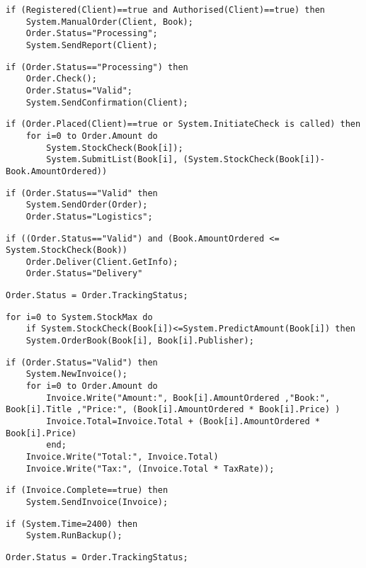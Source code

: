 \begin{lstlisting}[caption=/PF10/ Client places Order]
if (Registered(Client)==true and Authorised(Client)==true) then  
	System.ManualOrder(Client, Book);
	Order.Status="Processing";
	System.SendReport(Client);
\end{lstlisting}
\begin{lstlisting}[caption=/PF11/ Validate Order]
if (Order.Status=="Processing") then 
	Order.Check();
	Order.Status="Valid";
	System.SendConfirmation(Client);
\end{lstlisting}
\begin{lstlisting}[caption=/PF12/ Stock Update]
if (Order.Placed(Client)==true or System.InitiateCheck is called) then
	for i=0 to Order.Amount do
		System.StockCheck(Book[i]);
		System.SubmitList(Book[i], (System.StockCheck(Book[i])-Book.AmountOrdered))
\end{lstlisting}
\begin{lstlisting}[caption=/PF13/ Forward Order to Logistics]
if (Order.Status=="Valid" then
	System.SendOrder(Order);
	Order.Status="Logistics";
\end{lstlisting}
\begin{lstlisting}[caption=/PF14/ Deliver Order]
if ((Order.Status=="Valid") and (Book.AmountOrdered <= System.StockCheck(Book))
	Order.Deliver(Client.GetInfo);
	Order.Status="Delivery"
\end{lstlisting}
\begin{lstlisting}[caption=/PF15/ Confirm Delivery]
 Order.Status = Order.TrackingStatus;
\end{lstlisting}
\begin{lstlisting}[caption=/PF16/ BookExpress Order]
 for i=0 to System.StockMax do
 	if System.StockCheck(Book[i])<=System.PredictAmount(Book[i]) then
 	System.OrderBook(Book[i], Book[i].Publisher);
\end{lstlisting}
\begin{lstlisting}[caption=/PF20/ Create Invoice]
if (Order.Status="Valid") then
	System.NewInvoice();
	for i=0 to Order.Amount do 
		Invoice.Write("Amount:", Book[i].AmountOrdered ,"Book:", Book[i].Title ,"Price:", (Book[i].AmountOrdered * Book[i].Price) )
		Invoice.Total=Invoice.Total + (Book[i].AmountOrdered * Book[i].Price)
		end;
	Invoice.Write("Total:", Invoice.Total)
	Invoice.Write("Tax:", (Invoice.Total * TaxRate));
\end{lstlisting}
\begin{lstlisting}[caption=/PF21/ Send Invoice]
  if (Invoice.Complete==true) then 
  	System.SendInvoice(Invoice);
\end{lstlisting}
\begin{lstlisting}[caption=/PF30/ Backup]
 if (System.Time=2400) then
 	System.RunBackup();
\end{lstlisting}
\begin{lstlisting}[caption=/PF15/ Confirm Delivery]
 Order.Status = Order.TrackingStatus;
\end{lstlisting}